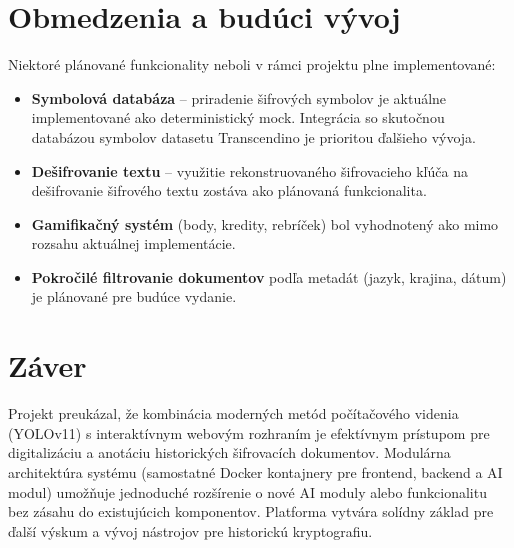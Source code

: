 \section*{Obmedzenia a budúci vývoj}

Niektoré plánované funkcionality neboli v rámci projektu plne implementované:

\begin{itemize}
    \item \textbf{Symbolová databáza} – priradenie šifrových symbolov je aktuálne implementované ako deterministický mock. Integrácia so skutočnou databázou symbolov datasetu Transcendino je prioritou ďalšieho vývoja.
    \item \textbf{Dešifrovanie textu} – využitie rekonstruovaného šifrovacieho kľúča na dešifrovanie šifrového textu zostáva ako plánovaná funkcionalita.
    \item \textbf{Gamifikačný systém} (body, kredity, rebríček) bol vyhodnotený ako mimo rozsahu aktuálnej implementácie.
    \item \textbf{Pokročilé filtrovanie dokumentov} podľa metadát (jazyk, krajina, dátum) je plánované pre budúce vydanie.
\end{itemize}

\section*{Záver}

Projekt preukázal, že kombinácia moderných metód počítačového videnia (YOLOv11) s interaktívnym webovým rozhraním je efektívnym prístupom pre digitalizáciu a anotáciu historických šifrovacích dokumentov. Modulárna architektúra systému (samostatné Docker kontajnery pre frontend, backend a AI modul) umožňuje jednoduché rozšírenie o nové AI moduly alebo funkcionalitu bez zásahu do existujúcich komponentov. Platforma vytvára solídny základ pre ďalší výskum a vývoj nástrojov pre historickú kryptografiu.
